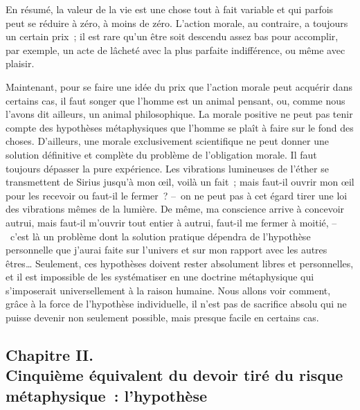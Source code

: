 \documentclass[french,twoside]{book} %
\begin{document}
En résumé, la valeur de la vie est une chose tout à fait variable et qui parfois peut se réduire à zéro, à moins de zéro. L’action morale, au contraire, a toujours un certain prix ; il est rare qu’un être soit descendu assez bas pour accomplir, par exemple, un acte de lâcheté avec la plus parfaite indifférence, ou même avec plaisir.\par
Maintenant, pour se faire une idée du prix que l’action morale peut acquérir dans certains cas, il faut songer que l’homme est un animal pensant, ou, comme nous l’avons dit ailleurs, un animal philosophique. La morale positive ne peut pas tenir compte des hypothèses métaphysiques que l’homme se plaît à faire sur le fond des choses. D’ailleurs, une morale exclusivement scientifique ne peut donner une solution définitive et complète du problème de l’obligation morale. Il faut toujours dépasser la pure expérience. Les vibrations lumineuses de l’éther se transmettent de Sirius jusqu’à mon œil, voilà un fait ; mais faut-il ouvrir mon œil pour les recevoir ou faut-il le fermer ? – on ne peut pas à cet égard tirer une loi des vibrations mêmes de la lumière. De même, ma conscience arrive à concevoir autrui, mais faut-il m’ouvrir tout entier à autrui, faut-il me fermer à moitié, – c’est là un problème dont la solution pratique dépendra de l’hypothèse personnelle que j’aurai faite sur l’univers et sur mon rapport avec les autres êtres… Seulement, ces hypothèses doivent rester absolument libres et personnelles, et il est impossible de les systématiser en une doctrine métaphysique qui s’imposerait universellement à la raison humaine. Nous allons voir comment, grâce à la force de l’hypothèse individuelle, il n’est pas de sacrifice absolu qui ne puisse devenir non seulement possible, mais presque facile en certains cas.
\subsection[{Chapitre II. Cinquième équivalent du devoir tiré du risque métaphysique : l’hypothèse}]{Chapitre II. \\
Cinquième équivalent du devoir tiré du risque métaphysique : l’hypothèse}
\end{document}
